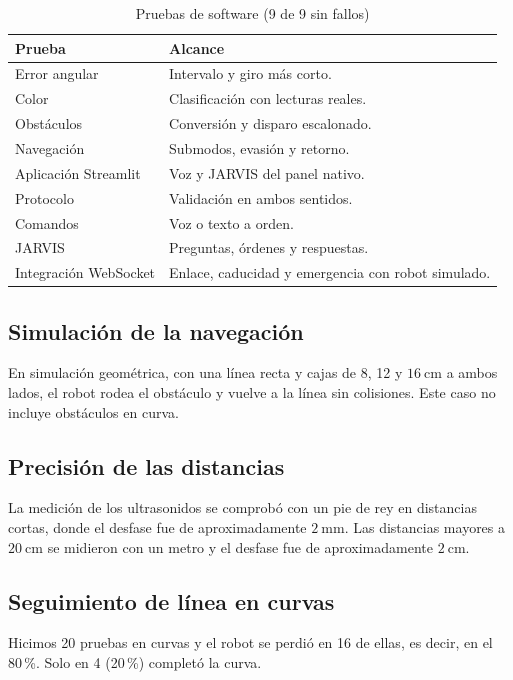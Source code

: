 \documentclass[journal]{IEEEtran}
\begin{document}
\begin{table}[H]
\centering
\caption{Pruebas de software (9 de 9 sin fallos)}
\label{tab:pruebas}
\scriptsize
\begin{tabular}{p{} p{}}
\toprule
\textbf{Prueba} & \textbf{Alcance} \\
\midrule
Error angular & Intervalo y giro más corto. \\
Color & Clasificación con lecturas reales. \\
Obstáculos & Conversión y disparo escalonado. \\
Navegación & Submodos, evasión y retorno. \\
Aplicación Streamlit & Voz y JARVIS del panel nativo. \\
Protocolo & Validación en ambos sentidos. \\
Comandos & Voz o texto a orden. \\
JARVIS & Preguntas, órdenes y respuestas. \\
Integración WebSocket & Enlace, caducidad y emergencia con robot simulado. \\
\bottomrule
\end{tabular}
\end{table}

\subsection{Simulación de la navegación}

En simulación geométrica, con una línea recta y cajas de 8, 12 y $16~\mathrm{cm}$ a ambos lados, el robot rodea el obstáculo y vuelve a la línea sin colisiones. Este caso no incluye obstáculos en curva.

\subsection{Precisión de las distancias}

La medición de los ultrasonidos se comprobó con un pie de rey en distancias cortas, donde el desfase fue de aproximadamente $2~\mathrm{mm}$. Las distancias mayores a $20~\mathrm{cm}$ se midieron con un metro y el desfase fue de aproximadamente $2~\mathrm{cm}$.

\subsection{Seguimiento de línea en curvas}

Hicimos 20 pruebas en curvas y el robot se perdió en 16 de ellas, es decir, en el 80\,\%. Solo en 4 (20\,\%) completó la curva.
\end{document}
